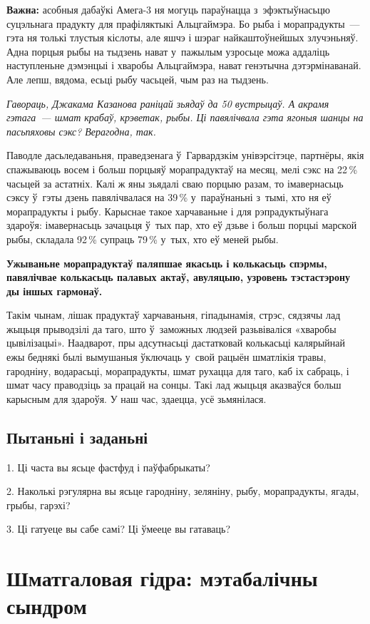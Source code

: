 \textbf{Важна:} асобныя дабаўкі Амега-3 ня могуць параўнацца з~эфэктыўнасьцю суцэльнага прадукту для прафіляктыкі Альцгаймэра. Бо рыба і морапрадукты~--- гэта ня толькі тлустыя кіслоты, але яшчэ і шэраг найкаштоўнейшых злучэньняў. Адна порцыя рыбы на тыдзень нават у~пажылым узросьце можа аддаліць наступленьне дэмэнцыі і хваробы Альцгаймэра, нават генэтычна дэтэрмінаванай. Але лепш, вядома, есьці рыбу часьцей, чым раз на тыдзень.

\emph{Гавораць, Джакама Казанова раніцай зьядаў да 50 вустрыцаў. А акрамя гэтага~--- шмат крабаў, крэветак, рыбы. Ці павялічвала гэта ягоныя шанцы на пасьпяховы сэкс? Верагодна, так.}

Паводле дасьледаваньня, праведзенага ў~Гарвардзкім унівэрсітэце, партнёры, якія спажываюць восем і больш порцыяў морапрадуктаў на месяц, мелі сэкс на 22\,\% часьцей за астатніх. Калі ж яны зьядалі сваю порцыю разам, то імавернасьць сэксу ў~гэты дзень павялічвалася на 39\,\% у~параўнаньні з~тымі, хто ня еў морапрадукты і рыбу. Карыснае такое харчаваньне і для рэпрадуктыўнага здароўя: імавернасьць зачацьця ў~тых пар, хто еў дзьве і больш порцыі марской рыбы, складала 92\,\% супраць 79\,\% у~тых, хто еў меней рыбы. 

\textbf{Ужываньне морапрадуктаў паляпшае якасьць і колькасьць спэрмы, павялічвае колькасьць палавых актаў, авуляцыю, узровень тэстастэрону ды іншых гармонаў.}

Такім чынам, лішак прадуктаў харчаваньня, гіпадынамія, стрэс, сядзячы лад жыцьця прыводзілі да таго, што ў~заможных людзей разьвіваліся «хваробы цывілізацыі». Наадварот, пры адсутнасьці дастатковай колькасьці калярыйнай ежы беднякі былі вымушаныя ўключаць у~свой рацыён шматлікія травы, гародніну, водарасьці, морапрадукты, шмат рухацца для таго, каб іх сабраць, і шмат часу праводзіць за працай на сонцы. Такі лад жыцьця аказваўся больш карысным для здароўя. У наш час, здаецца, усё зьмянілася.

\subsection*{Пытаньні і заданьні}

1. Ці часта вы ясьце фастфуд і паўфабрыкаты?

2. Наколькі рэгулярна вы ясьце гародніну, зеляніну, рыбу, морапрадукты, ягады, грыбы, гарэхі?

3. Ці гатуеце вы сабе самі? Ці ўмееце вы гатаваць?


\section{Шматгаловая гідра: мэтабалічны сындром}

